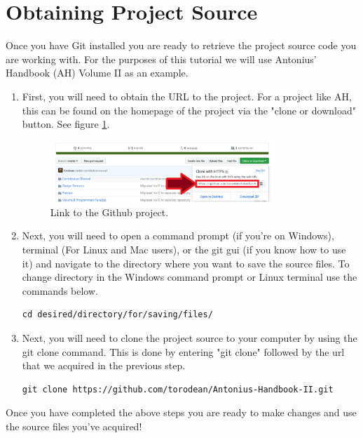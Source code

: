 \section{Obtaining Project Source}

Once you have Git installed you are ready to retrieve the project source code you are working with. For the purposes of this tutorial we will use Antonius' Handbook (AH) Volume II as an example. 

\begin{enumerate}
	\item First, you will need to obtain the URL to the project. For a project like AH, this can be found on the homepage of the project via the "clone or download" button. See figure \ref{gitclone}.
	
	\begin{figure}[h]
		\centering
		\includegraphics[width=0.8\textwidth]{images/gitclone.png}
		\caption{Link to the Github project.} \label{gitclone}
	\end{figure}

	\item Next, you will need to open a command prompt (if you're on Windows), terminal (For Linux and Mac users), or the git gui (if you know how to use it) and navigate to the directory where you want to save the source files. To change directory in the Windows command prompt or Linux terminal use the commands below.
	
\begin{lstlisting}
cd desired/directory/for/saving/files/
\end{lstlisting}
	
	\item Next, you will need to clone the project source to your computer by using the git clone command. This is done by entering "git clone" followed by the url that we acquired in the previous step.
	
\begin{lstlisting}
git clone https://github.com/torodean/Antonius-Handbook-II.git
\end{lstlisting}
\end{enumerate}

Once you have completed the above steps you are ready to make changes and use the source files you've acquired!



